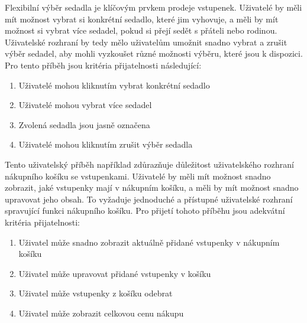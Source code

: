 \newcommand{\userstoryseatselection}{
}
\userstoryseatselection

Flexibilní výběr sedadla je klíčovým prvkem prodeje vstupenek.
Uživatelé by měli mít možnost vybrat si konkrétní sedadlo, které jim vyhovuje, a měli by mít možnost si vybrat více sedadel, pokud si přejí sedět s přáteli nebo rodinou.
Uživatelské rozhraní by tedy mělo uživatelům umožnit snadno vybrat a zrušit výběr sedadel, aby mohli vyzkoušet různé možnosti výběru, které jsou k dispozici.
Pro tento příběh jsou kritéria přijatelnosti následující:
\begin{enumerate}
    \item Uživatelé mohou kliknutím vybrat konkrétní sedadlo
    \item Uživatelé mohou vybrat více sedadel
    \item Zvolená sedadla jsou jasně označena
    \item Uživatelé mohou kliknutím zrušit výběr sedadla
\end{enumerate}

\newcommand{\userstoryshoppingcart}{
}
\userstoryshoppingcart

Tento uživatelský příběh například zdůrazňuje důležitost uživatelského rozhraní nákupního košíku se vstupenkami.
Uživatelé by měli mít možnost snadno zobrazit, jaké vstupenky mají v nákupním košíku, a měli by mít možnost snadno upravovat jeho obsah.
To vyžaduje jednoduché a přístupné uživatelské rozhraní spravující funkci nákupního košíku.
Pro přijetí tohoto příběhu jsou adekvátní kritéria přijatelnosti:
\begin{enumerate}
    \item Uživatel může snadno zobrazit aktuálně přidané vstupenky v nákupním košíku
    \item Uživatel může upravovat přidané vstupenky v košíku
    \item Uživatel může vstupenky z košíku odebrat
    \item Uživatel může zobrazit celkovou cenu nákupu
\end{enumerate}

\newcommand{\userstorycheckout}{
}
\userstorycheckout

